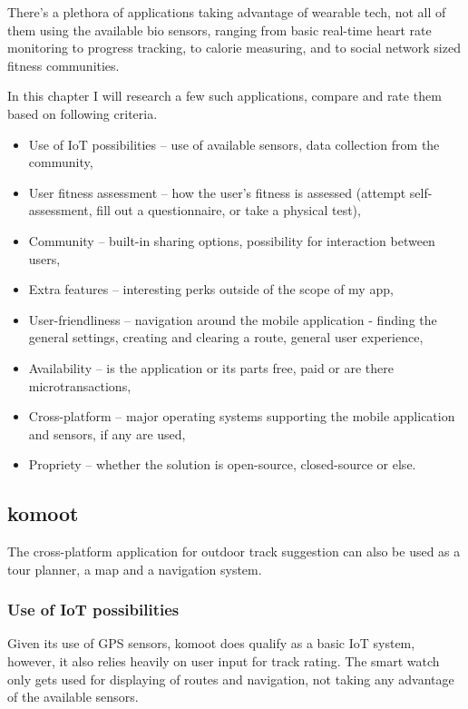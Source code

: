 There's a plethora of applications taking advantage of wearable tech, not all of them using the available bio sensors, ranging from basic real-time heart rate monitoring to progress tracking, to calorie measuring, and to social network sized fitness communities.

In this chapter I will research a few such applications, compare and rate them based on following criteria. 
\begin{itemize}
    \item Use of IoT possibilities -- use of available sensors, data collection from the community,
    \item User fitness assessment -- how the user's fitness is assessed (attempt self-assessment, fill out a questionnaire, or take a physical test),
    \item Community -- built-in sharing options, possibility for interaction between users,
    \item Extra features -- interesting perks outside of the scope of my app,
    \item User-friendliness -- navigation around the mobile application - finding the general settings, creating and clearing a route, general user experience,
    \item Availability -- is the application or its parts free, paid or are there microtransactions,
    \item Cross-platform -- major operating systems supporting the mobile application and sensors, if any are used,
    \item Propriety -- whether the solution is open-source, closed-source or else.
\end{itemize}


\subsection{komoot}
The cross-platform application for outdoor track suggestion can also be used as a tour planner, a map and a navigation system.


\subsubsection*{Use of IoT possibilities} Given its use of GPS sensors, komoot does qualify as a basic IoT system, however, it also relies heavily on user input for track rating.
The smart watch only gets used for displaying of routes and navigation, not taking any advantage of the available sensors.
